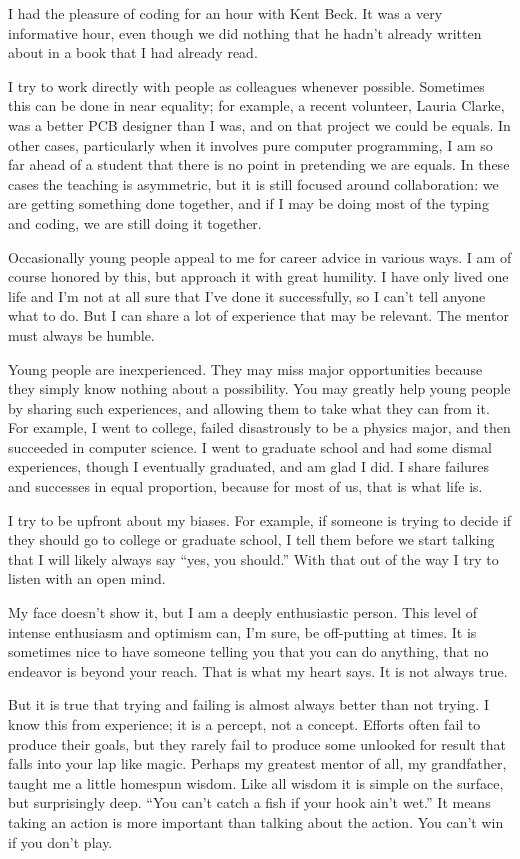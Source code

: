 \documentclass[
	fontsize=10pt, %
	twoside=false, %
	secnumdepth=1, %
]{kaobook}
\begin{document}
I had the pleasure of coding for an hour with Kent Beck. It was a very informative hour, even though we did nothing that he hadn’t already written about in a book that I had already read.

I try to work directly with people as colleagues whenever possible. Sometimes this can be done in near equality; for example, a recent volunteer, Lauria Clarke, was a better PCB designer than I was, and on that project we could be equals. In other cases, particularly when it involves pure computer programming, I am so far ahead of a student that there is no point in pretending we are equals. In these cases the teaching is asymmetric, but it is still focused around collaboration: we are getting something done together, and if I may be doing most of the typing and coding, we are still doing it together.

Occasionally young people appeal to me for career advice in various ways. I am of course honored by this, but approach it with great humility. I have only lived one life and I’m not at all sure that I’ve done it successfully, so I can’t tell anyone what to do. But I can share a lot of experience that may be relevant. The mentor must always be humble.

Young people are inexperienced. They may miss major opportunities because they simply know nothing about a possibility. You may greatly help young people by sharing such experiences, and allowing them to take what they can from it. For example, I went to college, failed disastrously to be a physics major, and then succeeded in computer science. I went to graduate school and had some dismal experiences, though I eventually graduated, and am glad I did. I share failures and successes in equal proportion, because for most of us, that is what life is.

I try to be upfront about my biases. For example, if someone is trying to decide if they should go to college or graduate school, I tell them before we start talking that I will likely always say “yes, you should.” With that out of the way I try to listen with an open mind.

My face doesn’t show it, but I am a deeply enthusiastic person. This level of intense enthusiasm and optimism can, I’m sure, be off-putting at times. It is sometimes nice to have someone telling you that you can do anything, that no endeavor is beyond your reach. That is what my heart says. It is not always true.

But it is true that trying and failing is almost always better than not trying. I know this from experience; it is a percept, not a concept. Efforts often fail to produce their goals, but they rarely fail to produce some unlooked for result that falls into your lap like magic. Perhaps my greatest mentor of all, my grandfather, taught me a little homespun wisdom. Like all wisdom it is simple on the surface, but surprisingly deep. “You can’t catch a fish if your hook ain’t wet.” It means taking an action is more important than talking about the action. You can’t win if you don’t play.
\end{document}
